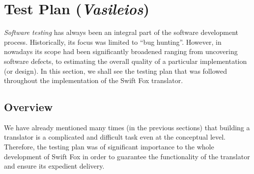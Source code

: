 \section{Test Plan (\textit{Vasileios})}

\textit{Software testing} has always been an integral part of the software
development process. Historically, its focus was limited to ``bug
hunting''. However, in nowadays its scope had been significantly broadened
ranging from uncovering software defects, to estimating the overall quality
of a particular implementation (or design). In this section, we shall see
the testing plan that was followed throughout the implementation of the
Swift Fox translator.

\subsection{Overview}

We have already mentioned many times (in the previous sections) that
building a translator is a complicated and difficult task even at the
conceptual level. Therefore, the testing plan was of significant importance
to the whole development of Swift Fox in order to guarantee the
functionality of the translator and ensure its expedient delivery.


